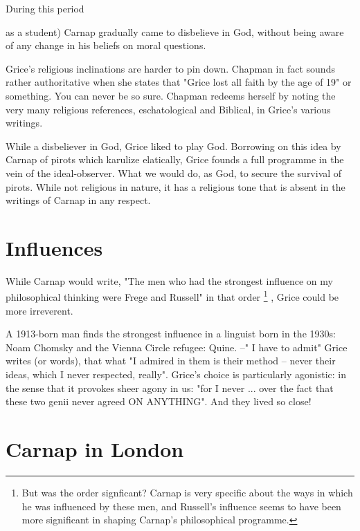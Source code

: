 \documentclass[10pt,titlepage]{book}
\begin{document}
During this period {as a student) Carnap gradually came to 
disbelieve in God, without being aware of any change in  his beliefs on moral questions. 

Grice's religious inclinations are harder to pin down. Chapman in  
fact sounds rather authoritative when she states that "Grice lost all faith by 
 the age of 19" or something. You can never be so sure. Chapman redeems 
herself  by noting the very many religious references, eschatological and 
Biblical, in  Grice's various writings.

While a disbeliever in God, Grice liked to play God. Borrowing on  
this idea by Carnap of pirots which karulize elatically, Grice founds a full  
programme in the vein of the ideal-observer. What we would do, as God, to 
secure  the survival of pirots. While not religious in nature, it has a 
religious tone  that is absent in the writings of Carnap in any respect.

\section{Influences}

While Carnap would write, "The men who had the strongest  influence on my 
philosophical thinking were Frege and Russell" in that order%
\footnote{But was the order signficant?
Carnap is very specific about the ways in which he was influenced by these men, and Russell's influence seems to have been more significant in shaping Carnap's philosophical programme.}%
,  Grice could be 
more irreverent.

A 1913-born man finds the strongest influence in  a 
linguist born in the 1930s: Noam Chomsky and the Vienna Circle refugee: Quine.  --"
I have to admit" Grice writes (or words), that what "I admired in them is  
their method -- never their ideas, which I never respected, really". Grice's 
 choice is particularly agonistic: in the sense that it provokes sheer 
agony in  us: "for I never ... over the fact that these two genii never agreed 
ON  ANYTHING".
And they lived so close!

\section{Carnap in London}

}
\end{document}
